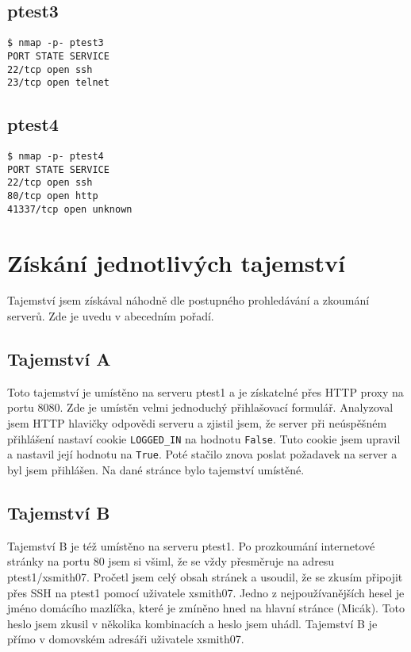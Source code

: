 \documentclass[11pt,a4paper]{article}
\begin{document}
\subsection{ptest3}
\texttt{\$ nmap -p- ptest3\\
PORT   STATE SERVICE\\
22/tcp open  ssh\\
23/tcp open  telnet\\
}

\subsection{ptest4}
\texttt{\$ nmap -p- ptest4\\
PORT      STATE  SERVICE\\
22/tcp    open   ssh\\
80/tcp    open   http\\
41337/tcp open   unknown\\
}

\section{Získání jednotlivých tajemství}

Tajemství jsem získával náhodně dle postupného prohledávání a zkoumání serverů. Zde je uvedu v abecedním pořadí.

\subsection{Tajemství A}
Toto tajemství je umístěno na serveru ptest1 a je získatelné přes HTTP proxy na portu 8080. Zde je umístěn velmi jednoduchý přihlašovací formulář. Analyzoval jsem HTTP hlavičky odpovědi serveru a zjistil jsem, že server při neúspěšném přihlášení nastaví cookie \texttt{LOGGED\_IN} na hodnotu \texttt{False}. Tuto cookie jsem upravil a nastavil její hodnotu na \texttt{True}. Poté stačilo znova poslat požadavek na server a byl jsem přihlášen. Na dané stránce bylo tajemství umístěné.

\subsection{Tajemství B}
Tajemství B je též umístěno na serveru ptest1. Po prozkoumání internetové stránky na portu 80 jsem si všiml, že se vždy přesměruje na adresu ptest1/xsmith07. Pročetl jsem celý obsah stránek a usoudil, že se zkusím připojit přes SSH na ptest1 pomocí uživatele xsmith07. Jedno z nejpoužívanějších hesel je jméno domácího mazlíčka, které je zmíněno hned na hlavní stránce (Micák). Toto heslo jsem zkusil v několika kombinacích a heslo jsem uhádl. Tajemství B je přímo v domovském adresáři uživatele xsmith07.
\end{document}
